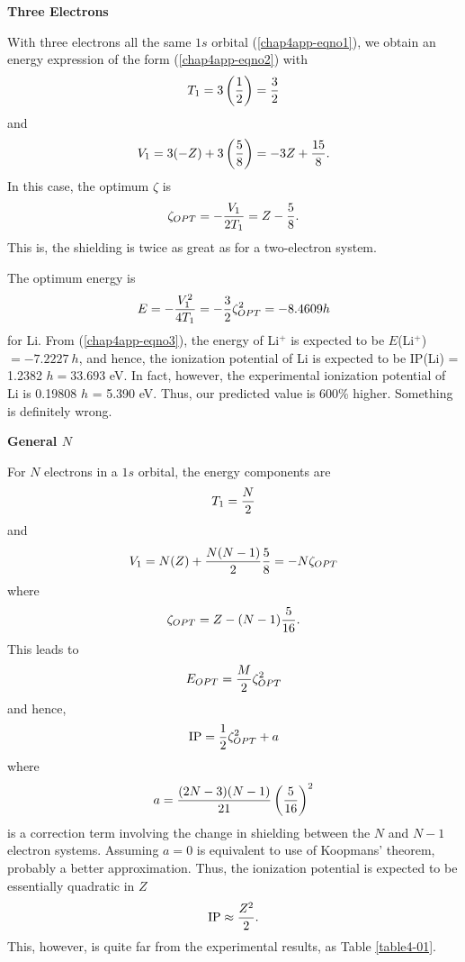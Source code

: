 {{\bf Three Electrons}

With three electrons all the same $1s$ orbital (\ref{chap4app-eqno1}),
we obtain an energy expression of the form (\ref{chap4app-eqno2}) with
\begin{equation}
T_1 = 3 \left( {1 \over 2} \right) = {3 \over 2}
\end{equation}
and
\begin{equation}
V_1 = 3 ( - Z) + 3 \left( {5 \over 8} \right) = - 3 Z + {15 \over 8} .
\end{equation}
In this case, the optimum $\zeta$ is
\begin{equation}
\zeta_{OPT} = - {V_1 \over 2T_1} = Z - {5 \over 8} .
\end{equation}
This is, the shielding is twice as great as for a two-electron system.

The optimum energy is
\begin{equation}
E = - {V^2_1 \over 4T_1} = - {3 \over 2} \zeta^2_{OPT} = - 8.4609h
\end{equation}
for Li.  From (\ref{chap4app-eqno3}), the energy of Li$^+$ is expected
to be $E$(Li$^+$) $= -7.2227\ h$, and hence, the ionization potential
of Li is expected to be IP(Li) = 1.2382 $h = 33.693$ eV. In fact,
however, the experimental ionization potential of Li is 0.19808 $h$ =
5.390 eV. Thus, our predicted value is 600\% higher.  Something is
definitely wrong.

{\bf General $N$}

For $N$ electrons in a $1s$ orbital, the energy components are
\begin{equation}
T_1 = {N \over 2}
\end{equation}
and
\begin{equation}
V_1 = N(Z) + {N(N-1) \over 2} {5 \over 8} = - N \zeta_{OPT}
\end{equation}
where
\begin{equation}
\zeta_{OPT} = Z - ( N - 1 ) {5 \over 16} .
\end{equation}
This leads to
\begin{equation}
E_{OPT} = {M \over 2} \zeta^2_{OPT}
\end{equation}
and hence,
\begin{equation}
\mathrm{IP} = {1 \over 2} \zeta^2_{OPT} + a
\end{equation}
where
\begin{equation}
a = {(2N -3)(N-1) \over 21} \left( {5 \over 16} \right)^2
\end{equation}
is a correction term involving the change in shielding between the $N$ and 
$N-1$ electron systems.  Assuming $a = 0$ is equivalent to use of Koopmans'
theorem, probably a better approximation.  Thus, the ionization potential is
expected to be essentially quadratic in $Z$
\begin{equation}
\mathrm{IP} \approx {Z^2 \over 2} .
\end{equation}
This, however, is quite far from the experimental results, as Table
\ref{table4-01}. 

}
